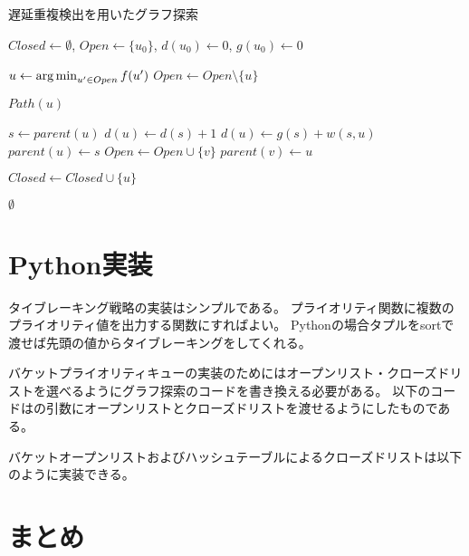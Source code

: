 \begin{algorithm}
\caption{遅延重複検出を用いたグラフ探索}
\label{alg:ddd}
	$Closed \leftarrow \emptyset$, $Open \leftarrow \{u_0\}$, $d(u_0) \leftarrow 0$, $g(u_0) \leftarrow 0$\;
	 {
                $u \leftarrow \operatorname*{arg\,min}_{u' \in Open} f(u')$ \;
	        $Open \leftarrow Open \setminus \{u\} $\;
          
		 {
			\Return $Path(u)$\;
		}

                $s \leftarrow parent(u)$\;
		 {
                  $d(u) \leftarrow d(s) + 1$\;
                  $d(u) \leftarrow g(s) + w(s, u)$\;
		  $parent(u) \leftarrow s$\;
		   {
		    $Open \leftarrow Open \cup \{v\}$\;
		    $parent(v) \leftarrow u$\;
		  }
		}

                 {
                  $Closed \leftarrow Closed \cup \{u\}$\;
                }
 	}
	\Return $\emptyset$\;
\end{algorithm}

\section{Python実装}

タイブレーキング戦略の実装はシンプルである。
プライオリティ関数に複数のプライオリティ値を出力する関数にすればよい。
Pythonの場合タプルをsortで渡せば先頭の値からタイブレーキングをしてくれる。


バケットプライオリティキューの実装のためにはオープンリスト・クローズドリストを選べるようにグラフ探索のコードを書き換える必要がある。
以下のコードはの引数にオープンリストとクローズドリストを渡せるようにしたものである。


バケットオープンリストおよびハッシュテーブルによるクローズドリストは以下のように実装できる。




\section{まとめ}

